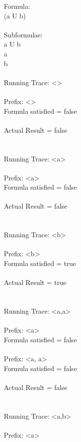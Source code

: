 Formula:\\
(a U b)\\
\\
Subformulae:\\
a U b\\
a\\
b\\
\\
Running Trace: \textless \textgreater\\
\\
  Prefix: \textless \textgreater\\
  Formula satisfied = false\\
\\
  Actual Result = false\\
\\
\\
Running Trace: \textless a\textgreater\\
\\
  Prefix: \textless a\textgreater\\
  Formula satisfied = false\\
\\
  Actual Result = false\\
\\
\\
Running Trace: \textless b\textgreater\\
\\
  Prefix: \textless b\textgreater\\
  Formula satisfied = true\\
\\
  Actual Result = true\\
\\
\\
Running Trace: \textless a,a\textgreater\\
\\
  Prefix: \textless a\textgreater\\
  Formula satisfied = false\\
\\
  Prefix: \textless a, a\textgreater\\
  Formula satisfied = false\\
\\
  Actual Result = false\\
\\
\\
Running Trace: \textless a,b\textgreater\\
\\
  Prefix: \textless a\textgreater\\
